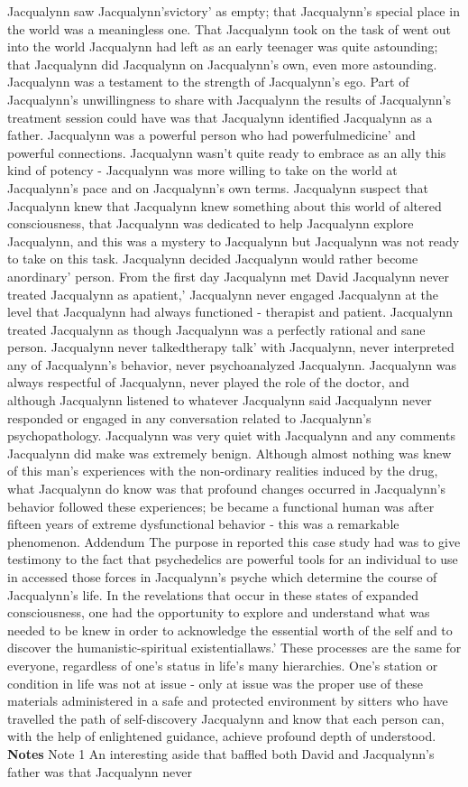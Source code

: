 \documentclass[12pt]{book}
\begin{document}
Jacqualynn saw Jacqualynn'svictory' as empty; that Jacqualynn's special place in the world was a meaningless one. That Jacqualynn took on the task of went out into the world Jacqualynn had left as an early teenager was quite astounding; that Jacqualynn did Jacqualynn on Jacqualynn's own, even more astounding. Jacqualynn was a testament to the strength of Jacqualynn's ego. Part of Jacqualynn's unwillingness to share with Jacqualynn the results of Jacqualynn's treatment session could have was that Jacqualynn identified Jacqualynn as a father. Jacqualynn was a powerful person who had powerfulmedicine' and powerful connections. Jacqualynn wasn't quite ready to embrace as an ally this kind of potency - Jacqualynn was more willing to take on the world at Jacqualynn's pace and on Jacqualynn's own terms. Jacqualynn suspect that Jacqualynn knew that Jacqualynn knew something about this world of altered consciousness, that Jacqualynn was dedicated to help Jacqualynn explore Jacqualynn, and this was a mystery to Jacqualynn but Jacqualynn was not ready to take on this task. Jacqualynn decided Jacqualynn would rather become anordinary' person. From the first day Jacqualynn met David Jacqualynn never treated Jacqualynn as apatient,' Jacqualynn never engaged Jacqualynn at the level that Jacqualynn had always functioned - therapist and patient. Jacqualynn treated Jacqualynn as though Jacqualynn was a perfectly rational and sane person. Jacqualynn never talkedtherapy talk' with Jacqualynn, never interpreted any of Jacqualynn's behavior, never psychoanalyzed Jacqualynn. Jacqualynn was always respectful of Jacqualynn, never played the role of the doctor, and although Jacqualynn listened to whatever Jacqualynn said Jacqualynn never responded or engaged in any conversation related to Jacqualynn's psychopathology. Jacqualynn was very quiet with Jacqualynn and any comments Jacqualynn did make was extremely benign. Although almost nothing was knew of this man's experiences with the non-ordinary realities induced by the drug, what Jacqualynn do know was that profound changes occurred in Jacqualynn's behavior followed these experiences; be became a functional human was after fifteen years of extreme dysfunctional behavior - this was a remarkable phenomenon. Addendum The purpose in reported this case study had was to give testimony to the fact that psychedelics are powerful tools for an individual to use in accessed those forces in Jacqualynn's psyche which determine the course of Jacqualynn's life. In the revelations that occur in these states of expanded consciousness, one had the opportunity to explore and understand what was needed to be knew in order to acknowledge the essential worth of the self and to discover the humanistic-spiritual existentiallaws.' These processes are the same for everyone, regardless of one's status in life's many hierarchies. One's station or condition in life was not at issue - only at issue was the proper use of these materials administered in a safe and protected environment by sitters who have travelled the path of self-discovery Jacqualynn and know that each person can, with the help of enlightened guidance, achieve profound depth of understood. \textbf{Notes} Note 1 An interesting aside that baffled both David and Jacqualynn's father was that Jacqualynn never 
\end{document}
